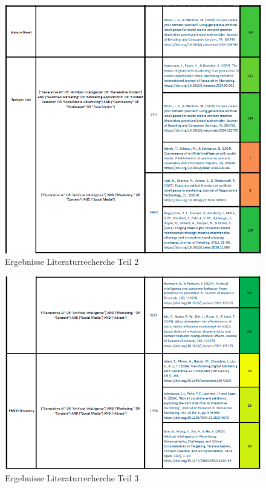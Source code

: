 \begin{figure}[htbp]
    \centering
    \includegraphics[width=\textwidth]{abbildungen/Literaturtabelle_2}
    \caption{Ergebnisse Literaturrecherche Teil 2}
    \label{fig:Literaturtabelle_2}
\end{figure}

\begin{figure}[htbp]
    \centering
    \includegraphics[width=\textwidth]{abbildungen/Literaturtabelle_3}
    \caption{Ergebnisse Literaturrecherche Teil 3}
    \label{fig:Literaturtabelle_3}
\end{figure}

